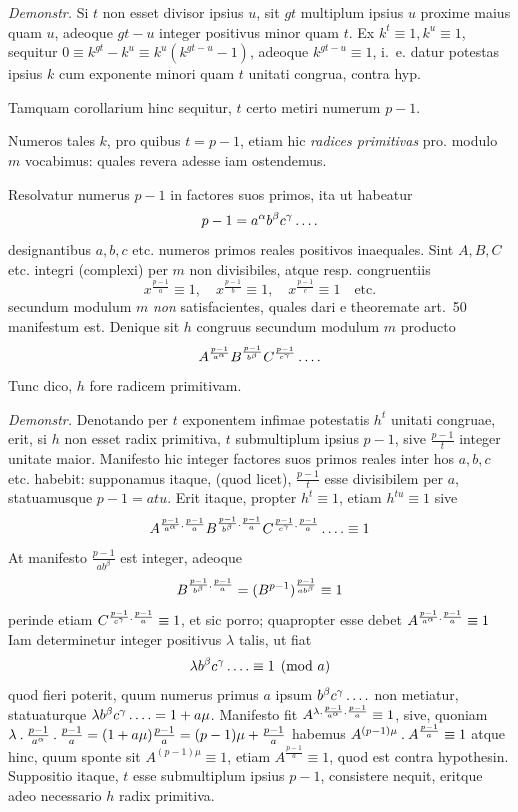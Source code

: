 %
\emph{Demonstr.} Si $t$ non esset divisor ipsius $u$, sit $gt$ multiplum ipsius $u$ proxime maius quam $u$, adeoque $gt-u$ integer positivus minor quam $t$. Ex $k^t\equiv1,k^u\equiv1$, sequitur $0\equiv k^{gt}-k^u\equiv k^u(k^{gt-u}-1)$, adeoque $k^{gt-u}\equiv1$, i.~e. datur potestas ipsius $k$ cum exponente minori quam $t$ unitati congrua, contra hyp.

Tamquam corollarium hinc sequitur, $t$ certo metiri numerum $p-1$.

Numeros tales $k$, pro quibus $t=p-1$, etiam hic \emph{radices primitivas} pro. modulo $m$ vocabimus: quales revera adesse iam ostendemus.

Resolvatur numerus $p-1$ in factores suos primos, ita ut habeatur
\[
p-1=a^\alpha b^\beta c^\gamma\mathinner{.\,.\,.\,.}
\]
designantibus $a,b,c$ etc. numeros primos reales positivos inaequales. Sint $A,B,C$ etc. integri (complexi) per $m$ non divisibiles, atque resp. congruentiis
\[
x^{\frac{p-1}a}\equiv1,\quad x^{\frac{p-1}b}\equiv1,\quad x^{\frac{p-1}c}\equiv1\quad\text{etc.}
\]
secundum modulum $m$ \emph{non} satisfacientes, quales dari e theoremate art.~50 manifestum est. Denique sit $h$ congruus secundum modulum $m$ producto
\[
A^{\frac{p-1}{a^\alpha}}B^{\frac{p-1}{b^\beta}}C^{\frac{p-1}{c^\gamma}}\mathinner{.\,.\,.\,.}
\]
Tunc dico, $h$ fore radicem primitivam.

\emph{Demonstr.} Denotando per $t$ exponentem infimae potestatis $h^t$ unitati congruae, erit, si $h$ non esset radix primitiva, $t$ submultiplum ipsius $p-1$, sive $\frac{p-1}t$ integer unitate maior. Manifesto hic integer factores suos primos reales inter hos $a,b,c$ etc. habebit: supponamus itaque, (quod licet), $\frac{p-1}t$ esse divisibilem per $a$, statuamusque $p-1=atu$. Erit itaque, propter $h^t\equiv1$, etiam $h^{tu}\equiv1$ sive
\[
A^{\frac{p-1}{a^\alpha}\mathbin{.}\frac{p-1}a}B^{\frac{p-1}{b^\beta}\mathbin{.}\frac{p-1}a}C^{\frac{p-1}{c^\gamma}\mathbin{.}\frac{p-1}a}\mathinner{.\,.\,.\,.}\equiv1
\]
At manifesto $\frac{p-1}{ab^\beta}$ est integer, adeoque
\[
B^{\frac{p-1}{b^\beta}\mathbin{.}\frac{p-1}a}=(B^{p-1})^{\frac{p-1}{ab^\beta}}\equiv1
\]
perinde etiam
%
$C^{\frac{p-1}{c^\gamma}\mathbin{.}\frac{p-1}a}\equiv1$, et sic porro; quapropter esse debet $A^{\frac{p-1}{a^\alpha}\mathbin{.}\frac{p-1}a}\equiv1$
Iam determinetur integer positivus $\lambda$ talis, ut fiat
\[
\lambda b^\beta c^\gamma\mathinner{.\,.\,.\,.}\equiv1\pmod a
\]
quod fieri poterit, quum numerus primus $a$ ipsum $b^\beta c^\gamma\mathinner{.\,.\,.\,.}$ non metiatur, statuaturque $\lambda b^\beta c^\gamma\mathinner{.\,.\,.\,.}=1+a\mu$. Manifesto fit $A^{\lambda\mathbin{.}\frac{p-1}{a^\alpha}\mathbin{.}\frac{p-1}a}\equiv1$, sive, quoniam $\lambda\mathbin{.}\frac{p-1}{a^\alpha}\mathbin{.}\frac{p-1}a=(1+a\mu)\frac{p-1}a=(p-1)\mu+\frac{p-1}a$ habemus $A^{(p-1)\mu}\mathbin{.} A^{\frac{p-1}a}\equiv1$ atque hinc, quum sponte sit $A^{(p-1)\mu}\equiv1$, etiam $A^{\frac{p-1}a}\equiv1$, quod est contra hypothesin. Suppositio itaque, $t$ esse submultiplum ipsius $p-1$, consistere nequit, eritque adeo necessario $h$ radix primitiva.

